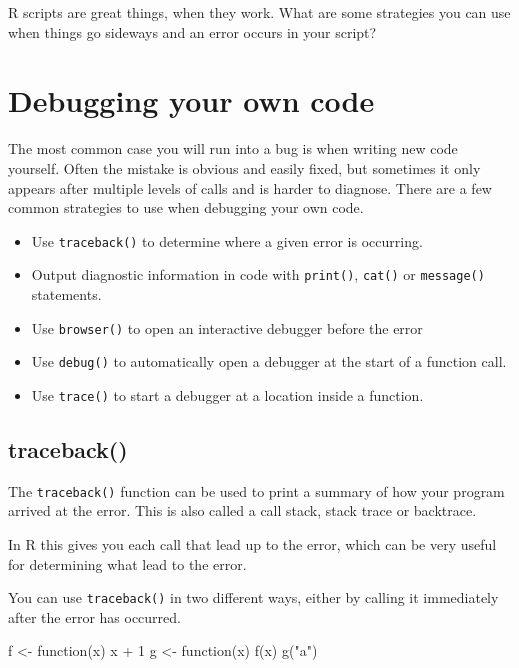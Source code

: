 \documentclass[
  letterpaper,
]{book}
\newenvironment{Shaded}{\begin{snugshade}}{\end{snugshade}}
\newcommand{\ControlFlowTok}[1]{\textcolor[rgb]{0.00,0.23,0.31}{#1}}
\newcommand{\DecValTok}[1]{\textcolor[rgb]{0.68,0.00,0.00}{#1}}
\newcommand{\FunctionTok}[1]{\textcolor[rgb]{0.28,0.35,0.67}{#1}}
\newcommand{\NormalTok}[1]{\textcolor[rgb]{0.00,0.23,0.31}{#1}}
\newcommand{\OtherTok}[1]{\textcolor[rgb]{0.00,0.23,0.31}{#1}}
\newcommand{\SpecialCharTok}[1]{\textcolor[rgb]{0.37,0.37,0.37}{#1}}
\newcommand{\StringTok}[1]{\textcolor[rgb]{0.13,0.47,0.30}{#1}}
\providecommand{\tightlist}{%
  \setlength{\itemsep}{0pt}\setlength{\parskip}{0pt}}\usepackage{longtable,booktabs,array}
\begin{document}
R scripts are great things, when they work. What are some strategies you
can use when things go sideways and an error occurs in your script?

\hypertarget{debugging-your-own-code}{%
\section*{Debugging your own code}\label{debugging-your-own-code}}

The most common case you will run into a bug is when writing new code
yourself. Often the mistake is obvious and easily fixed, but sometimes
it only appears after multiple levels of calls and is harder to
diagnose. There are a few common strategies to use when debugging your
own code.

\begin{itemize}
\tightlist
\item
  Use \texttt{traceback()} to determine where a given error is
  occurring.
\item
  Output diagnostic information in code with \texttt{print()},
  \texttt{cat()} or \texttt{message()} statements.
\item
  Use \texttt{browser()} to open an interactive debugger before the
  error
\item
  Use \texttt{debug()} to automatically open a debugger at the start of
  a function call.
\item
  Use \texttt{trace()} to start a debugger at a location inside a
  function.
\end{itemize}

\hypertarget{traceback}{%
\subsection*{traceback()}\label{traceback}}

The \texttt{traceback()} function can be used to print a summary of how
your program arrived at the error. This is also called a call stack,
stack trace or backtrace.

In R this gives you each call that lead up to the error, which can be
very useful for determining what lead to the error.

You can use \texttt{traceback()} in two different ways, either by
calling it immediately after the error has occurred.

\begin{Shaded}
\begin{Highlighting}[]
\NormalTok{f }\OtherTok{\textless{}{-}} \ControlFlowTok{function}\NormalTok{(x) x }\SpecialCharTok{+} \DecValTok{1}
\NormalTok{g }\OtherTok{\textless{}{-}} \ControlFlowTok{function}\NormalTok{(x) }\FunctionTok{f}\NormalTok{(x)}
\FunctionTok{g}\NormalTok{(}\StringTok{"a"}\NormalTok{)}
\end{Highlighting}
\end{Shaded}
\end{document}
